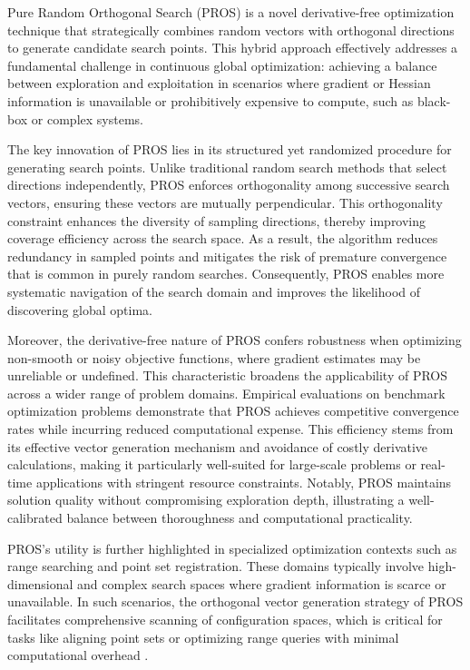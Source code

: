 \documentclass[sigconf]{acmart}
\begin{document}
Pure Random Orthogonal Search (PROS) is a novel derivative-free optimization technique that strategically combines random vectors with orthogonal directions to generate candidate search points. This hybrid approach effectively addresses a fundamental challenge in continuous global optimization: achieving a balance between exploration and exploitation in scenarios where gradient or Hessian information is unavailable or prohibitively expensive to compute, such as black-box or complex systems.

The key innovation of PROS lies in its structured yet randomized procedure for generating search points. Unlike traditional random search methods that select directions independently, PROS enforces orthogonality among successive search vectors, ensuring these vectors are mutually perpendicular. This orthogonality constraint enhances the diversity of sampling directions, thereby improving coverage efficiency across the search space. As a result, the algorithm reduces redundancy in sampled points and mitigates the risk of premature convergence that is common in purely random searches. Consequently, PROS enables more systematic navigation of the search domain and improves the likelihood of discovering global optima.

Moreover, the derivative-free nature of PROS confers robustness when optimizing non-smooth or noisy objective functions, where gradient estimates may be unreliable or undefined. This characteristic broadens the applicability of PROS across a wider range of problem domains. Empirical evaluations on benchmark optimization problems demonstrate that PROS achieves competitive convergence rates while incurring reduced computational expense. This efficiency stems from its effective vector generation mechanism and avoidance of costly derivative calculations, making it particularly well-suited for large-scale problems or real-time applications with stringent resource constraints. Notably, PROS maintains solution quality without compromising exploration depth, illustrating a well-calibrated balance between thoroughness and computational practicality.

PROS’s utility is further highlighted in specialized optimization contexts such as range searching and point set registration. These domains typically involve high-dimensional and complex search spaces where gradient information is scarce or unavailable. In such scenarios, the orthogonal vector generation strategy of PROS facilitates comprehensive scanning of configuration spaces, which is critical for tasks like aligning point sets or optimizing range queries with minimal computational overhead \cite{ref8}.
\end{document}
